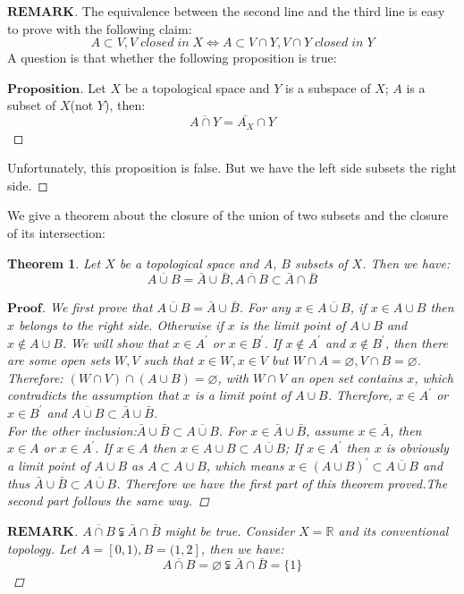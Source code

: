 \documentclass[a4paper, 11pt]{article}
\newtheorem{theorem}{Theorem}
\theoremstyle{remark}
\newenvironment{myremark}
{\renewcommand\qedsymbol{$ $}\begin{proof}[$\mathbf{REMARK}$]}
  {\end{proof}}
\newenvironment{myprf}
{\renewcommand\qedsymbol{$ $}\begin{proof}[$\mathbf{Proof}$]}
  {\end{proof}}
\newenvironment{myprop}
{\renewcommand\qedsymbol{$ $}\begin{proof}[$\mathbf{Proposition}$]}
  {\end{proof}}
\theoremstyle{definition}
\begin{document}
\begin{myremark}
\noindent
The equivalence between the second line and the third line is easy to prove with
the following claim:
$$
A\subset V,V\;closed\;in\;X\Leftrightarrow A\subset V\cap Y,V\cap Y\;closed\;in\;Y
$$
        A question is that whether the following proposition is true:
        \begin{myprop}
               Let $X$ be a topological space and $Y$ is a subspace of $X$;
               $A$ is a subset of $X$(not $Y$), then:
               $$
               \overline{A\cap Y}=\bar{A_X}\cap Y
               $$
        \end{myprop}
        \noindent
        Unfortunately, this proposition is false. But we have the left side
        subsets the right side.
\end{myremark}

We give a theorem about the closure of the union of two subsets and the closure
of its intersection:
\begin{theorem}
       Let $X$ be a topological space and $A$, $B$ subsets of $X$. Then we have:
       $$
       \overline{A\cup B}=\bar{A}\cup\bar{B},\overline{A\cap B}\subset \bar{A}
       \cap \bar{B}
       $$
 \begin{myprf}
       We first prove that $\overline{A\cup B}=\bar{A}\cup \bar{B}$. For any 
       $x\in\overline{A\cup B}$, if $x\in A\cup B$ then $x$ belongs to the
       right side. Otherwise if $x$ is the limit point of $A\cup B$ and $x\notin
       A\cup B$. We will show that $x\in A^{'}$ or $x\in B^{'}$. If $x\notin
       A^{'}$ and $x\notin B^{'}$, then there are some open sets $W,V$ such that
       $x\in W,x\in V$ but $W\cap A=\varnothing,V\cap B=\varnothing$. Therefore:
       $(W\cap V)\cap (A\cup B)=\varnothing$, with $W\cap V$ an open set contains
       $x$, which contradicts the assumption that $x$ is a limit point of $A\cup
       B$. Therefore, $x\in A^{'}$ or $x\in B^{'}$ and $\overline {A\cup B}
       \subset \bar{A}\cup \bar{B}$. \\
       \indent
       For the other inclusion:$\bar{A}\cup \bar{B}\subset \overline{A\cup B}$. 
       For $x\in \bar{A}\cup\bar{B}$, assume $x\in \bar{A}$, then $x\in A$ 
       or $x\in A^{'}$. If $x\in A$ then $x\in A\cup B\subset \overline{A\cup B}$;
       If $x\in A^{'}$ then $x$ is obviously a limit point of $A\cup B$ as 
       $A\subset A\cup B$, which means $x\in (A\cup B)^{'}\subset 
       \overline{A\cup B}$ and thus $\bar{A}\cup \bar{B}\subset \overline{A\cup B}$. Therefore we have the first part of this theorem proved.The second part 
       follows the same way.
 \end{myprf}
 \begin{myremark}
        $\overline{A\cap B}\subsetneqq \bar{A}\cap \bar{B}$ might be true. 
        Consider $X=\mathbb{R}$ and its conventional topology. Let $A=[0,1),
        B=(1,2]$, then we have:
        $$
        \overline{A\cap B}=\varnothing\subsetneqq
        \bar{A}\cap \bar{B}=\{1\}
        $$
 \end{myremark}

\end{theorem}
\end{document}
